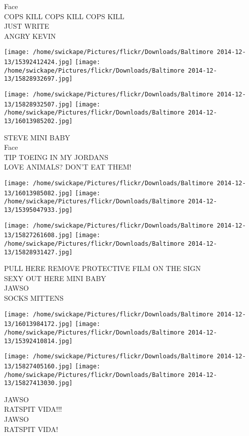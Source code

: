\documentclass[10pt,letterpaper]{article}
\begin{document}
Face\\
COPS KILL COPS KILL COPS KILL\\
JUST WRITE\\
ANGRY KEVIN\\
\pagebreak

\texttt{[image: /home/swickape/Pictures/flickr/Downloads/Baltimore 2014-12-13/15392412424.jpg]}
\texttt{[image: /home/swickape/Pictures/flickr/Downloads/Baltimore 2014-12-13/15828932697.jpg]}

\texttt{[image: /home/swickape/Pictures/flickr/Downloads/Baltimore 2014-12-13/15828932507.jpg]}
\texttt{[image: /home/swickape/Pictures/flickr/Downloads/Baltimore 2014-12-13/16013985202.jpg]}

STEVE MINI BABY\\
Face\\
TIP TOEING IN MY JORDANS\\
LOVE ANIMALS?  DON'T EAT THEM!\\
\pagebreak

\texttt{[image: /home/swickape/Pictures/flickr/Downloads/Baltimore 2014-12-13/16013985082.jpg]}
\texttt{[image: /home/swickape/Pictures/flickr/Downloads/Baltimore 2014-12-13/15395047933.jpg]}

\texttt{[image: /home/swickape/Pictures/flickr/Downloads/Baltimore 2014-12-13/15827261608.jpg]}
\texttt{[image: /home/swickape/Pictures/flickr/Downloads/Baltimore 2014-12-13/15828931427.jpg]}

PULL HERE REMOVE PROTECTIVE FILM ON THE SIGN\\
SEXY OUT HERE MINI BABY\\
JAWSO\\
SOCKS MITTENS\\
\pagebreak

\texttt{[image: /home/swickape/Pictures/flickr/Downloads/Baltimore 2014-12-13/16013984172.jpg]}
\texttt{[image: /home/swickape/Pictures/flickr/Downloads/Baltimore 2014-12-13/15392410814.jpg]}

\texttt{[image: /home/swickape/Pictures/flickr/Downloads/Baltimore 2014-12-13/15827405160.jpg]}
\texttt{[image: /home/swickape/Pictures/flickr/Downloads/Baltimore 2014-12-13/15827413030.jpg]}

JAWSO\\
RATSPIT VIDA!!!\\
JAWSO\\
RATSPIT VIDA!\\
\pagebreak
\end{document}
